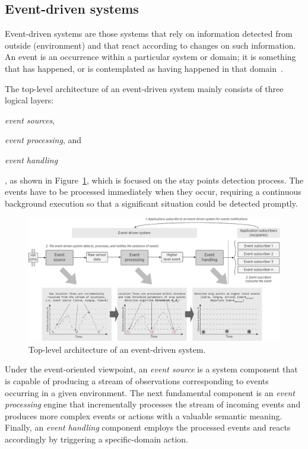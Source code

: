 \documentclass[ENG,PhD]{cinvestav}
\begin{document}
\subsection{Event-driven systems}
Event-driven systems are those systems that rely on information detected from outside (environment) and that react according to changes on such information.
An event is an occurrence within a particular system or domain; it is something that has happened, or is contemplated as having happened in that domain~\cite{Etzion2011}.

The top-level architecture of an event-driven system mainly consists of three logical layers: 
\begin{listahorizontal}
  \item \emph{event sources},
  \item \emph{event processing}, and
  \item \emph{event handling}
\end{listahorizontal}, as shown in Figure~\ref{fig:event-based-system-architecture}, which is focused on the stay points detection process.
The events have to be processed immediately when they occur, requiring a continuous background execution so that a significant situation could be detected promptly.

\begin{figure}
  \centering
  \includegraphics[width=\textwidth]{vectors/event-driven-system}
  \caption{Top-level architecture of an event-driven system.}
  \label{fig:event-based-system-architecture}
\end{figure}

Under the event-oriented viewpoint, an \emph{event source} is a system component that is capable of producing a stream of observations corresponding to events occurring in a given environment.
The next fundamental component is an \emph{event processing} engine that incrementally processes the stream of incoming events and produces more complex events or actions with a valuable semantic meaning.
Finally, an \emph{event handling} component employs the processed events and reacts accordingly by triggering a specific-domain action.
\end{document}
